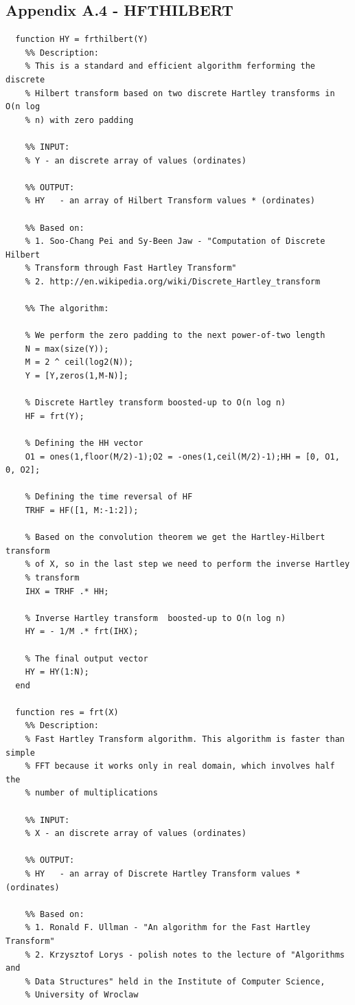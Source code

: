 \documentclass[12pt,twoside,a4paper]{article}
\numberwithin{equation}{subsection}
\numberwithin{figure}{subsection}
\begin{document}
\subsection*{Appendix A.4 - HFTHILBERT}
\begin{lstlisting}
  function HY = frthilbert(Y)
    %% Description:
    % This is a standard and efficient algorithm ferforming the discrete
    % Hilbert transform based on two discrete Hartley transforms in O(n log
    % n) with zero padding

    %% INPUT:
    % Y - an discrete array of values (ordinates)

    %% OUTPUT:
    % HY   - an array of Hilbert Transform values * (ordinates)

    %% Based on:
    % 1. Soo-Chang Pei and Sy-Been Jaw - "Computation of Discrete Hilbert
    % Transform through Fast Hartley Transform"
    % 2. http://en.wikipedia.org/wiki/Discrete_Hartley_transform

    %% The algorithm:
        
    % We perform the zero padding to the next power-of-two length
    N = max(size(Y));
    M = 2 ^ ceil(log2(N));
    Y = [Y,zeros(1,M-N)];

    % Discrete Hartley transform boosted-up to O(n log n)
    HF = frt(Y);

    % Defining the HH vector
    O1 = ones(1,floor(M/2)-1);O2 = -ones(1,ceil(M/2)-1);HH = [0, O1, 0, O2];

    % Defining the time reversal of HF
    TRHF = HF([1, M:-1:2]);

    % Based on the convolution theorem we get the Hartley-Hilbert transform
    % of X, so in the last step we need to perform the inverse Hartley
    % transform
    IHX = TRHF .* HH;

    % Inverse Hartley transform  boosted-up to O(n log n)
    HY = - 1/M .* frt(IHX);

    % The final output vector
    HY = HY(1:N);
  end

  function res = frt(X)
    %% Description:
    % Fast Hartley Transform algorithm. This algorithm is faster than simple 
    % FFT because it works only in real domain, which involves half the 
    % number of multiplications
      
    %% INPUT:
    % X - an discrete array of values (ordinates)

    %% OUTPUT:
    % HY   - an array of Discrete Hartley Transform values * (ordinates)

    %% Based on:
    % 1. Ronald F. Ullman - "An algorithm for the Fast Hartley Transform"
    % 2. Krzysztof Lorys - polish notes to the lecture of "Algorithms and
    % Data Structures" held in the Institute of Computer Science,
    % University of Wroclaw


\end{lstlisting}
\end{document}
